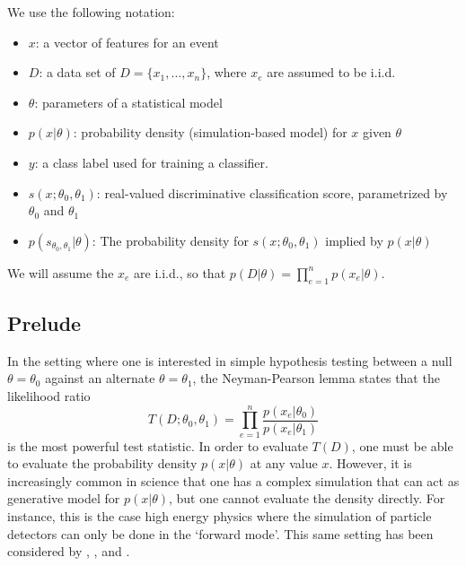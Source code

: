 \documentclass[aoas,preprint]{imsart}
\numberwithin{equation}{section}
\theoremstyle{plain}
\begin{document}
We use the following notation:
\begin{itemize}
 \item $x$: a vector of features for an event
 \item $D$: a data set of $D=\{x_1, \dots, x_n\}$, where $x_e$ are assumed to be i.i.d.
 \item $\theta$: parameters of a statistical model
\item $p(x| \theta)$:  probability density  (simulation-based model) for $x$ given $\theta$
\item $y$: a class label used for training a classifier.
\item $s(x;\theta_0, \theta_1)$: real-valued discriminative classification score, parametrized by $\theta_0$ and $\theta_1$
\item $p( s_{\theta_0, \theta_1} | \theta )$: The probability density  for $s(x; \theta_0, \theta_1)$ implied by $p(x|\theta)$ 
\end{itemize}
We will assume the $x_e$ are i.i.d., so that $p(D|\theta) = \prod_{e=1}^n p(x_e | \theta)$.

\subsection{Prelude}

In the setting where one is interested in simple hypothesis testing between a null $\theta=\theta_0$ against an alternate $\theta=\theta_1$, the Neyman-Pearson lemma states that the likelihood ratio 
\begin{equation}
T(D; \theta_0, \theta_1) = \prod_{e=1}^n \frac{ p(x_e|\theta_0)}{ p(x_e|\theta_1)}
\end{equation}
is the most powerful test statistic. In order to evaluate $T(D)$, one must be able to evaluate the probability density 
$p(x| \theta)$ at any value $x$. However, it is increasingly common in science that one has a complex simulation that 
can act as generative model  for $p(x|\theta)$, but one cannot evaluate the density directly. For instance, this is the case 
high energy physics where the simulation of particle detectors can only be done in the `forward mode'. This same setting has been considered by \cite{ClaytonScott}, \cite{JMLR:v14:tong13a}, and \cite{Neal:2007zz}.
\end{document}
